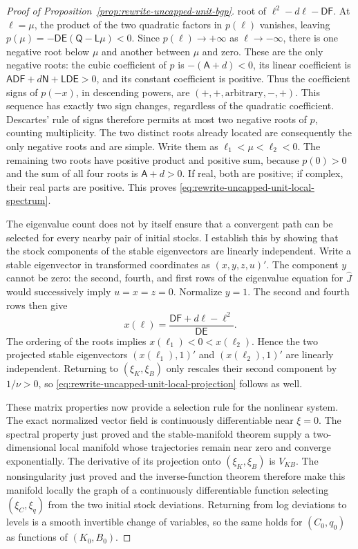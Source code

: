 \begin{proof}[Proof of Proposition~\ref{prop:rewrite-uncapped-unit-bgp}]
root of $\ell^2-d\ell-\mathsf D\mathsf F$. At $\ell=\mu$, the product
of the two quadratic factors in $p(\ell)$ vanishes, leaving
$p(\mu)=-\mathsf D\mathsf E(\mathsf Q-\mathsf L\mu)<0$.
Since $p(\ell)\to+\infty$ as $\ell\to-\infty$, there is one
negative root below $\mu$ and another between $\mu$ and zero.
These are the only negative roots: the cubic coefficient of $p$ is
$-(\mathsf A+d)<0$, its linear coefficient is
$\mathsf A\mathsf D\mathsf F+d\mathsf N+\mathsf L\mathsf D\mathsf E>0$,
and its constant coefficient is positive. Thus the coefficient signs of
$p(-x)$, in descending powers, are $(+,+,\text{arbitrary},-,+)$.
This sequence has exactly two sign changes, regardless of the quadratic
coefficient. Descartes' rule of signs therefore permits at most two
negative roots of $p$, counting multiplicity. The two distinct roots
already located are consequently the only negative roots and are simple.
Write them as $\ell_1<\mu<\ell_2<0$.
The remaining two roots have positive product and positive sum, because
$p(0)>0$ and the sum of all four roots is $\mathsf A+d>0$.
If real, both are positive; if complex, their real parts are positive.
This proves \eqref{eq:rewrite-uncapped-unit-local-spectrum}.

The eigenvalue count does not by itself ensure that a convergent path can
be selected for every nearby pair of initial stocks. I establish this by
showing that the stock components of the stable eigenvectors are linearly
independent. Write a stable eigenvector in transformed coordinates as
$(x,y,z,u)'$.
The component $y$ cannot be zero: the second, fourth, and first rows
of the eigenvalue equation for $\widehat J$ would successively imply $u=x=z=0$.
Normalize $y=1$. The second and fourth rows then give
\[
 x(\ell)=\frac{\mathsf D\mathsf F+d\ell-\ell^2}{\mathsf D\mathsf E}.
\]
The ordering of the roots implies $x(\ell_1)<0<x(\ell_2)$.
Hence the two projected stable eigenvectors $(x(\ell_1),1)'$ and
$(x(\ell_2),1)'$ are linearly independent. Returning to $(\xi_K,\xi_B)$
only rescales their second component by $1/\nu>0$, so
\eqref{eq:rewrite-uncapped-unit-local-projection} follows as well.

These matrix properties now provide a selection rule for the nonlinear
system. The exact normalized vector field is continuously differentiable
near $\xi=0$. The spectral property just proved and the stable-manifold
theorem supply a two-dimensional local manifold
whose trajectories remain near zero and converge exponentially.
The derivative of its projection onto $(\xi_K,\xi_B)$ is $V_{KB}$.
The nonsingularity just proved and the
inverse-function theorem therefore make this manifold locally the
graph of a continuously differentiable function selecting $(\xi_C,\xi_q)$
from the two initial stock deviations. Returning from log deviations to
levels is a smooth invertible change of variables, so the same holds for
$(C_0,q_0)$ as functions of $(K_0,B_0)$.


\end{proof}
